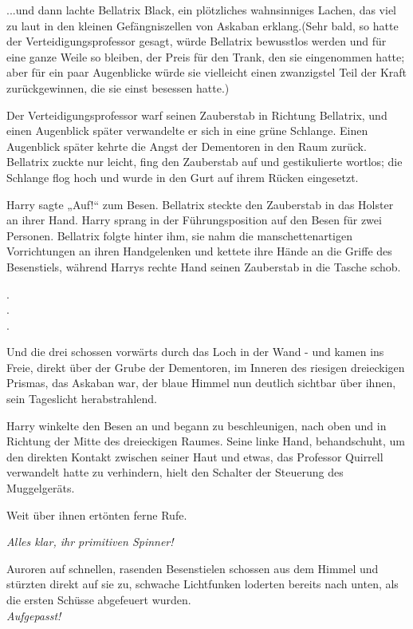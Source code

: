 {...und dann lachte Bellatrix Black, ein plötzliches wahnsinniges Lachen, das viel zu laut in den kleinen Gefängniszellen von Askaban erklang.(Sehr bald, so hatte der Verteidigungsprofessor gesagt, würde Bellatrix bewusstlos werden und für eine ganze Weile so bleiben, der Preis für den Trank, den sie eingenommen hatte; aber für ein paar Augenblicke würde sie vielleicht einen zwanzigstel Teil der Kraft zurückgewinnen, die sie einst besessen hatte.)

Der Verteidigungsprofessor warf seinen Zauberstab in Richtung Bellatrix, und einen Augenblick später verwandelte er sich in eine grüne Schlange. Einen Augenblick später kehrte die Angst der Dementoren in den Raum zurück. Bellatrix zuckte nur leicht, fing den Zauberstab auf und gestikulierte wortlos; die Schlange flog hoch und wurde in den Gurt auf ihrem Rücken eingesetzt.

Harry sagte „Auf!“ zum Besen. Bellatrix steckte den Zauberstab in das Holster an ihrer Hand. Harry sprang in der Führungsposition auf den Besen für zwei Personen. Bellatrix folgte hinter ihm, sie nahm die manschettenartigen Vorrichtungen an ihren Handgelenken und kettete ihre Hände an die Griffe des Besenstiels, während Harrys rechte Hand seinen Zauberstab in die Tasche schob.

.\\ .\\ .

Und die drei schossen vorwärts durch das Loch in der Wand - und kamen ins Freie, direkt über der Grube der Dementoren, im Inneren des riesigen dreieckigen Prismas, das Askaban war, der blaue Himmel nun deutlich sichtbar über ihnen, sein Tageslicht herabstrahlend.

Harry winkelte den Besen an und begann zu beschleunigen, nach oben und in Richtung der Mitte des dreieckigen Raumes. Seine linke Hand, behandschuht, um den direkten Kontakt zwischen seiner Haut und etwas, das Professor Quirrell verwandelt hatte zu verhindern, hielt den Schalter der Steuerung des Muggelgeräts.

Weit über ihnen ertönten ferne Rufe.

\emph{Alles klar, ihr primitiven Spinner!}

Auroren auf schnellen, rasenden Besenstielen schossen aus dem Himmel und stürzten direkt auf sie zu, schwache Lichtfunken loderten bereits nach unten, als die ersten Schüsse abgefeuert wurden.\\

\hfill\break \emph{Aufgepasst!}

}
